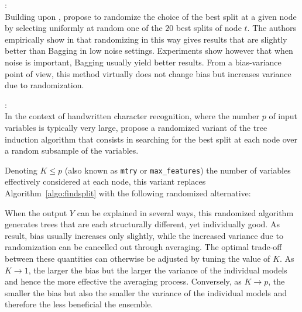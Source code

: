 \begin{description}
\item \citet{dietterich:1995}: \hfill \\
    Building upon \citep{kwok:1990}, \citet{dietterich:1995} propose
    to randomize the choice of the best split at a given node by selecting
    uniformly at random one of the $20$ best splits of node $t$. The authors empirically
    show in \citep{dietterich:1995,dietterich:2000} that randomizing in this
    way gives results that are slightly better than Bagging in low noise settings.
    Experiments show however that when noise is important, Bagging usually
    yield better results. From a bias-variance point of view, this method
    virtually does not change bias but increases variance due to randomization.

\item \citet{amit:1997}: \hfill \\
    In the context of handwritten character recognition, where the number $p$
    of input variables is typically very large, \citet{amit:1997} propose a
    randomized variant of the tree induction algorithm that consists in
    searching for the best split at each node over a random subsample of the
    variables.

    Denoting $K \leq p$ (also known as \texttt{mtry} or
    \texttt{max\_features}) the number of variables effectively considered at
    each node, this variant replaces Algorithm~\ref{algo:findsplit}
    with the following randomized alternative:
    When the output $Y$ can be explained in several ways, this randomized
    algorithm generates trees that are each structurally different, yet
    individually good. As result, bias usually increases only slightly, while
    the increased variance due to randomization can be cancelled out through averaging. The
    optimal trade-off between these quantities can otherwise be adjusted by
    tuning the value of $K$. As $K \to 1$, the larger the bias but the larger the
    variance of the individual models and hence the more effective the
    averaging process. Conversely, as $K \to p$, the smaller the bias but also the
    smaller the variance of the individual models and therefore the less
    beneficial the ensemble.


\end{description}
